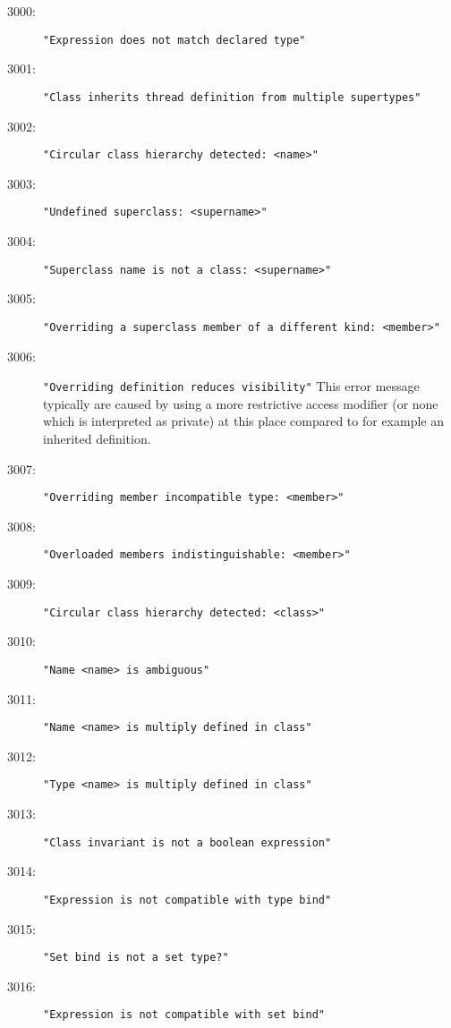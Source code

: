 %
%
%

\begin{description}
\item[3000:] \texttt{"Expression does not match declared type"}
\item[3001:] \texttt{"Class inherits thread definition from multiple supertypes"}
\item[3002:] \texttt{"Circular class hierarchy detected:\ <name>"}
\item[3003:] \texttt{"Undefined superclass:\ <supername>"}
\item[3004:] \texttt{"Superclass name is not a class:\ <supername>"}
\item[3005:] \texttt{"Overriding a superclass member of a different kind:\ <member>"}
\item[3006:] \texttt{"Overriding definition reduces visibility"}  This
  error message typically are caused by using a more restrictive
  access modifier (or none which is interpreted as private) at this
  place compared to for example an inherited definition.
\item[3007:] \texttt{"Overriding member incompatible type:\ <member>"}
\item[3008:] \texttt{"Overloaded members indistinguishable:\ <member>"}
\item[3009:] \texttt{"Circular class hierarchy detected:\ <class>"}
\item[3010:] \texttt{"Name <name> is ambiguous"}
\item[3011:] \texttt{"Name <name> is multiply defined in class"}
\item[3012:] \texttt{"Type <name> is multiply defined in class"}
\item[3013:] \texttt{"Class invariant is not a boolean expression"}
\item[3014:] \texttt{"Expression is not compatible with type bind"}
\item[3015:] \texttt{"Set bind is not a set type?"}
\item[3016:] \texttt{"Expression is not compatible with set bind"}

\end{description}
